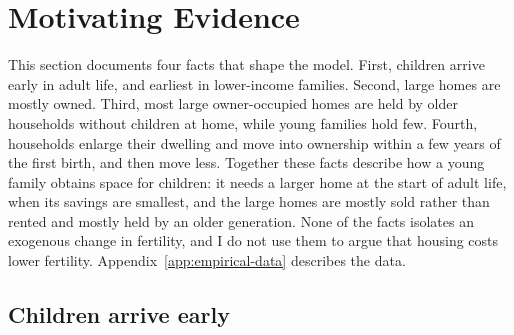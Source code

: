 \providecommand{\mocktodo}[1]{\textcolor{red}{[TODO: #1]}}

\section{Motivating Evidence}
\label{sec:empirical-evidence}

This section documents four facts that shape the model. First, children
arrive early in adult life, and earliest in lower-income families. Second,
large homes are mostly owned. Third, most large owner-occupied homes are held
by older households without children at home, while young families hold few.
Fourth, households enlarge their dwelling and move into ownership within a few
years of the first birth, and then move less. Together these facts describe
how a young family obtains space for children: it needs a larger home at the
start of adult life, when its savings are smallest, and the large homes are
mostly sold rather than rented and mostly held by an older generation. None
of the facts isolates an exogenous change in fertility, and I do not use them
to argue that housing costs lower fertility. Appendix~\ref{app:empirical-data}
describes the data.

\subsection{Children arrive early}

